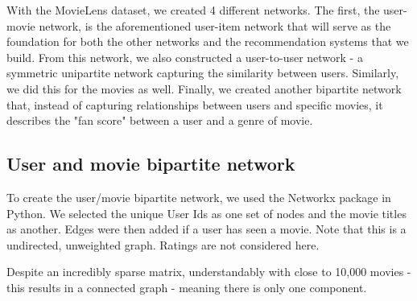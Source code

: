 \documentclass[12pt]{article}
\numberwithin{equation}{section}
\begin{document}
With the MovieLens dataset, we created 4 different networks.  The first, the user-movie network, is the aforementioned user-item network that will serve as the foundation for both the other networks and the recommendation systems that we build. From this network, we also constructed a user-to-user network - a symmetric unipartite network capturing the similarity between users. Similarly, we did this for the movies as well. Finally, we created another bipartite network that, instead of capturing relationships between users and specific movies, it describes the "fan score" between a user and a genre of movie.

\subsection{User and movie bipartite network}

To create the user/movie bipartite network, we used the Networkx package in Python. We selected the unique User Ids as one set of nodes and the movie titles as another. Edges were then added if a user has seen a movie. Note that this is a undirected, unweighted graph. Ratings are not considered here.

Despite an incredibly sparse matrix, understandably with close to 10,000 movies - this results in a connected graph - meaning there is only one component.
\end{document}
